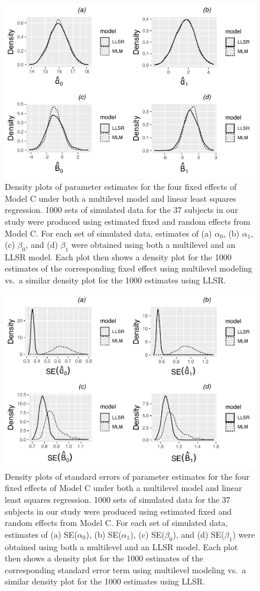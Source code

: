 \documentclass[
]{krantz}
\begin{document}
\begin{figure}

{\centering \includegraphics[width=0.6\linewidth]{bookdown-BeyondMLR_files/figure-latex/mli-density1-1} 

}

\caption{Density plots of parameter estimates for the four fixed effects of Model C under both a multilevel model and linear least squares regression. 1000 sets of simulated data for the 37 subjects in our study were produced using estimated fixed and random effects from Model C. For each set of simulated data, estimates of (a) \(\alpha_{0}\), (b) \(\alpha_{1}\), (c) \(\beta_{0}\), and (d) \(\beta_{1}\) were obtained using both a multilevel and an LLSR model. Each plot then shows a density plot for the 1000 estimates of the corresponding fixed effect using multilevel modeling vs.~a similar density plot for the 1000 estimates using LLSR.}\label{fig:mli-density1}
\end{figure}



\begin{figure}

{\centering \includegraphics[width=0.6\linewidth]{bookdown-BeyondMLR_files/figure-latex/mli-density2-1} 

}

\caption{Density plots of standard errors of parameter estimates for the four fixed effects of Model C under both a multilevel model and linear least squares regression. 1000 sets of simulated data for the 37 subjects in our study were produced using estimated fixed and random effects from Model C. For each set of simulated data, estimates of (a) SE(\(\alpha_{0}\)), (b) SE(\(\alpha_{1}\)), (c) SE(\(\beta_{0}\)), and (d) SE(\(\beta_{1}\)) were obtained using both a multilevel and an LLSR model. Each plot then shows a density plot for the 1000 estimates of the corresponding standard error term using multilevel modeling vs.~a similar density plot for the 1000 estimates using LLSR.}\label{fig:mli-density2}
\end{figure}
\end{document}

